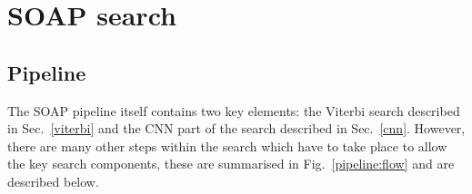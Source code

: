 \chapter{SOAP search}

\section{Pipeline}

The \ac{SOAP} pipeline itself contains two key elements: the Viterbi search described in Sec.~\ref{viterbi} and the \ac{CNN} part of the search described in Sec.~\ref{cnn}. However, there are many other steps within the search which have to take place to allow the key search components, these are summarised in Fig.~\ref{pipeline:flow} and are described below.

